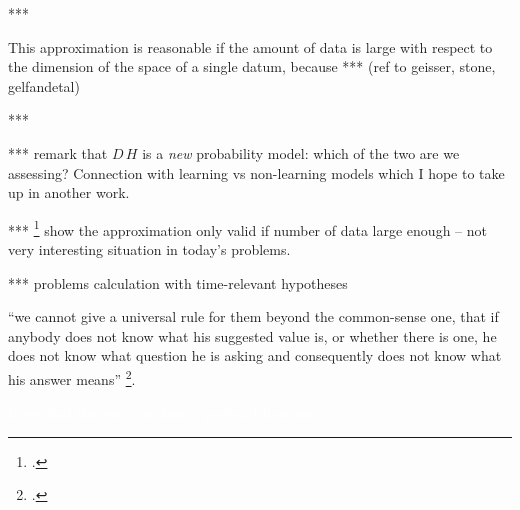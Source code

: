 \documentclass[\ifafour a4paper,12pt,\else a5paper,10pt,\fi%
onecolumn,oneside,article,%
british%
]{memoir}
\makeatletter
\theoremstyle{remark}
\theoremstyle{innote}
\def\sum{\DOTSI\sumop\slimits@}
\newcommand*{\citep}{\footcites}
\newcommand*{\de}{\partialup}%
\newcommand*{\p}{\mathrm{P}}%
\renewcommand*{\|}[1][]{\nonscript\,#1\vert\nonscript\;\mathopen{}}
\newcommand*{\sect}{\S}%
\newcommand*{\tsum}{\mathop{\textstyle\sum}\nolimits}
\newcommand*{\yM}{\varMu}
\newcommand*{\yA}{A}
\newcommand*{\ym}{\varEta}
\newcommand*{\yE}{E}
\newcommand*{\yq}{\bm{q}}
\makeatother
\begin{document}
***

This approximation is reasonable if the amount of data is large with
respect to the dimension of the space of a single datum, because *** (ref
to geisser, stone, gelfandetal)

***

*** remark that $D\,H$ is a \emph{new} probability model: which of the two
are we assessing? Connection with learning vs non-learning models which I
hope to take up in another work.

***  \citep[\sect~6.1.6]{bernardoetal1994} show the approximation only
valid if number of data large enough -- not very interesting situation in
today's problems.


*** problems calculation with time-relevant hypotheses


\enquote{we cannot give a universal rule for them beyond the common-sense one, that if anybody does not know what his suggested value is, or whether there is one, he does not know what question he is asking and consequently does not know what his answer means} \citep[\sect~3.1 p.~124 ]{jeffreys1939_r1983}.



\textcolor{white}{If you find this you can claim a postcard from me.}






\end{document}

